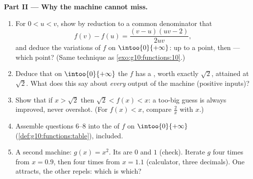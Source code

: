 \begin{problem}
\medskip
\noindent\textbf{Part II --- Why the machine cannot miss.}
\begin{enumerate}[resume]
  \item For $0 < u < v$, show by reduction to a common
        denominator that
        \[
        f(v) - f(u) = \frac{(v - u)(uv - 2)}{2uv} ,
        \]
        and deduce the variations of $f$ on
        $\intoo{0}{+\infty}$:  up to a point, then
         --- which point? (Same technique as
        \cref{exo:g10:functions:10}.)
  \item Deduce that on $\intoo{0}{+\infty}$ the  $f$ has
        a , worth exactly $\sqrt2$, attained at
        $\sqrt2$. What does this say about \emph{every} output
        of the machine (positive inputs)?
  \item Show that if $x > \sqrt2$ then
        $\sqrt2 < f(x) < x$: a too-big guess is always improved,
        never overshot. (For $f(x) < x$, compare $\frac2x$ with
        $x$.)
  \item Assemble questions 6--8 into the  of $f$
        on $\intoo{0}{+\infty}$
        (\cref{def:g10:functions:table}),  included.
  \item A second machine: $g(x) = x^2$. Its  are
        $0$ and $1$ (check). Iterate $g$ four times from
        $x = 0.9$, then four times from $x = 1.1$ (calculator,
        three decimals). One  attracts, the other
        repels: which is which?
\end{enumerate}


\end{problem}
